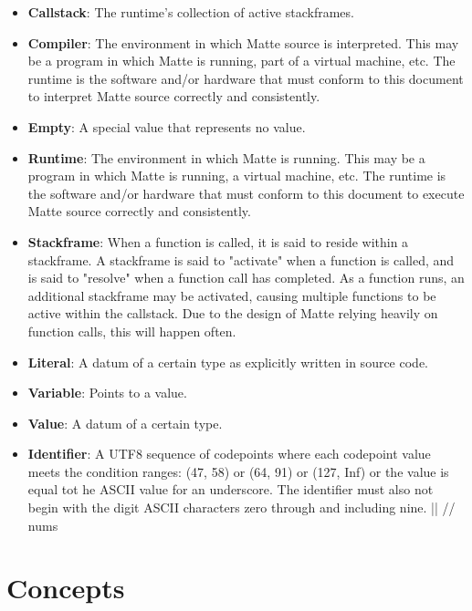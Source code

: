 \documentclass[12pt,letterpaper]{report}
\begin{document}
\begin{itemize}

\item \textbf{Callstack}: The runtime's collection of active stackframes.

\item \textbf{Compiler}: The environment in which Matte source is interpreted. This may be a program in which Matte is running, part of a virtual machine, etc. The runtime is the software and/or hardware that must conform to this document to interpret Matte source correctly and consistently.

\item \textbf{Empty}: A special value that represents no value. 

\item \textbf{Runtime}: The environment in which Matte is running. This may be a program in which Matte is running, a virtual machine, etc. The runtime is the software and/or hardware that must conform to this document to execute Matte source correctly and consistently.

\item \textbf{Stackframe}: When a function is called, it is said to reside within a stackframe. A stackframe is said to "activate" when a function is called, and is said to "resolve" when a function call has completed. As a function runs, an additional stackframe may be activated, causing multiple functions to be active within the callstack. Due to the design of Matte relying heavily on function calls, this will happen often.

\item \textbf{Literal}: A datum of a certain type as explicitly written in source code.

\item \textbf{Variable}: Points to a value.

\item \textbf{Value}: A datum of a certain type.

\item \textbf{Identifier}: A UTF8 sequence of codepoints where each codepoint value meets the condition ranges: (47, 58) or (64, 91) or (127, Inf) or the value is equal tot he ASCII value for an underscore. The identifier must also not begin with the digit ASCII characters zero through and including nine.   || // nums

\end{itemize}

\section{Concepts}\label{Concepts}
\end{document}
